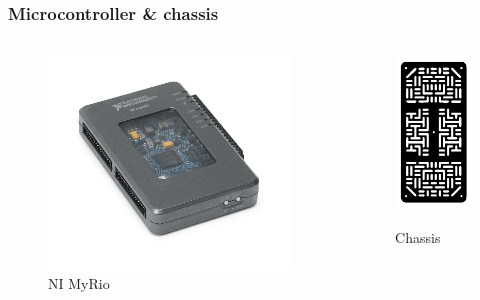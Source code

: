 \documentclass
   [kulak] %
   {kulakbeamer}
\begin{document}
\begin{frame}
	\frametitle{Microcontroller \& chassis}
	\begin{columns}
		\begin{figure}
			\centering
			\includegraphics[width=.7\textwidth]{NI-myrio}
		\caption{NI MyRio}%
		\end{figure}
		\begin{figure}
			\centering
			\includegraphics[width=.45\textwidth]{chassis}
			\caption{Chassis}\cite{RobotChassisRechthoekigZwart}
		\end{figure}
		
	\end{columns}
	
\end{frame}
\end{document}

